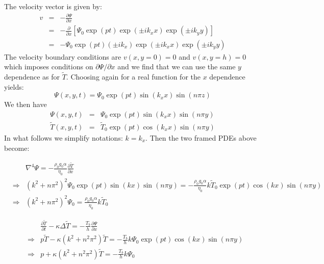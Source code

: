The velocity vector is given by:
\begin{eqnarray}
v &=& -\frac{\partial \Psi}{\partial x}  \\
  &=& -\frac{\partial }{\partial x} \left[  \Psi_0 \exp(pt)\exp(\pm i k_x x) \exp(\pm i k_y y) \right] \\
  &=& - \Psi_0 \exp(pt) (\pm i k_x) \exp(\pm i k_x x) \exp(\pm i k_y y)
\end{eqnarray}
The velocity boundary conditions are $v(x,y=0)=0$ and $v(x,y=h)=0$ 
which imposes conditions on $\partial \Psi/\partial x$ and we find that we 
can use the same $y$ dependence as for $\tilde{T}$. 
Choosing again for a real function for the $x$ dependence yields:
\[
\Psi(x,y,t) = \Psi_0 \exp(pt) \sin(k_x x) \sin(n\pi z)
\]
We then have
\begin{eqnarray}
\Psi(x,y,t) &=& \Psi_0 \exp(pt)  \sin(k_x x) \sin(n\pi y)  \\
\tilde{T}(x,y,t)  &=& \tilde{T}_0 \exp(pt)  \cos(k_x x) \sin(n\pi y)   
\end{eqnarray}
In what follows we simplify notations: $k=k_x$. Then the two framed PDEs above become:


\begin{eqnarray}
&& \nabla^4 \Psi= -\frac{\rho_0 g_0 \alpha}{\eta_0} \frac{\partial \tilde{T}}{\partial x} \\
&\Rightarrow& 
(k^2 + n \pi^2)^2 \Psi_0 \exp(pt)  \sin(k x) \sin(n\pi y) = -\frac{\rho_0 g_0 \alpha}{\eta_0} 
 k \tilde{T}_0 \exp(pt)  \cos(k x) \sin(n\pi y)  \\ 
&\Rightarrow& 
(k^2 + n \pi^2)^2 \Psi_0     = \frac{\rho_0 g_0 \alpha}{\eta_0} 
 k \tilde{T}_0   
\end{eqnarray}


\begin{eqnarray}
&& \frac{\partial \tilde{T}}{\partial t} - \kappa \Delta \tilde{T} 
= -  \frac{T_b}{h}   \frac{\partial \Psi}{\partial x} \\
&\Rightarrow & p \tilde{T} - \kappa (k^2 + n^2\pi^2) \tilde{T}   
= -  \frac{T_b}{h} k \Psi_0 \exp(pt)  \cos(k x) \sin(n\pi y) \\
&\Rightarrow & p + \kappa (k^2 + n^2\pi^2) \tilde{T}   
= -  \frac{T_b}{h} k \Psi_0  \\
\end{eqnarray}

